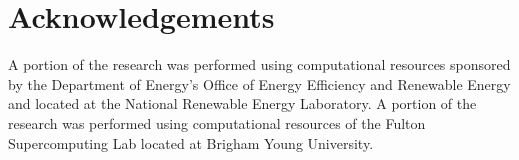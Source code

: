 \documentclass[conf]{new-aiaa}
\begin{document}




\section*{Acknowledgements}
A portion of the research was performed using computational resources sponsored by the Department of Energy's Office of Energy Efficiency and Renewable Energy and located at the National Renewable Energy Laboratory. A portion of the research was performed using computational resources of the Fulton Supercomputing Lab located at Brigham Young University.
\end{document}
